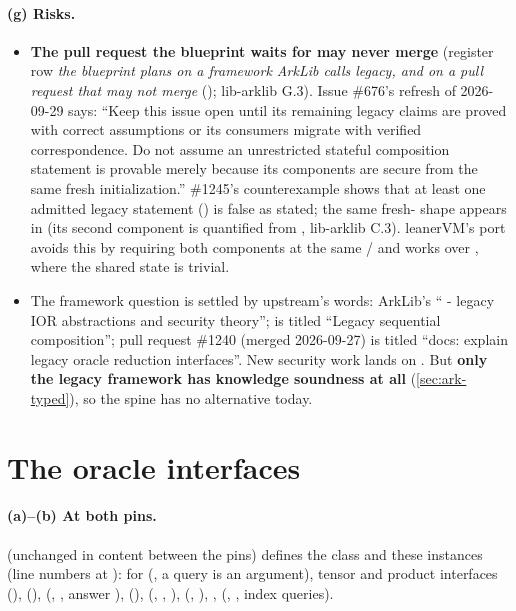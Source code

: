 \paragraph{(g) Risks.}
\begin{itemize}
\item \textbf{The pull request the blueprint waits for may never merge} (register row \emph{the
  blueprint plans on a framework ArkLib calls legacy, and on a pull request that may not merge}
  (); lib-arklib G.3). Issue \#676's refresh of 2026-09-29 says: ``Keep this issue open
  until its remaining legacy claims are proved with correct assumptions or its consumers migrate
  with verified correspondence. Do not assume an unrestricted stateful composition statement is
  provable merely because its components are secure from the same fresh initialization.''
  \#1245's counterexample shows that at least one admitted legacy statement
  () is false as stated; the same fresh- shape
  appears in  (its second component is quantified from
  , lib-arklib C.3). leanerVM's port avoids this by requiring both components at the
  same / and works over , where the shared state is trivial.
\item The framework question is settled by upstream's words: ArkLib's 
  `` - legacy IOR abstractions and security theory'';
   is titled ``Legacy sequential composition''; pull
  request \#1240 (merged 2026-09-27) is titled ``docs: explain legacy oracle reduction
  interfaces''. New security work lands on . But \textbf{only the
  legacy framework has knowledge soundness at all} (\cref{sec:ark-typed}), so the spine has no
  alternative today.
\end{itemize}

\section{The oracle interfaces}\label{sec:ark-oracles}

\paragraph{(a)--(b) At both pins.}
 (unchanged in content between the pins)
defines the class and these instances (line numbers at ):  for
 (, a query is an argument), tensor and product interfaces
(),  (),
 (,
, answer ),  (),
 (, , ),
 (,
), ,  (, , index
queries).

